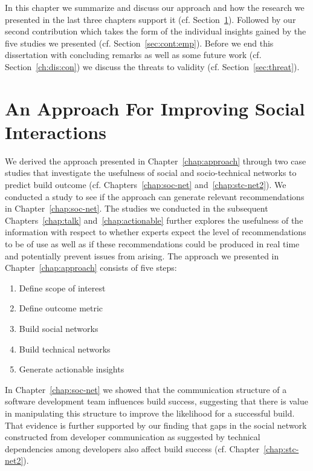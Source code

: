 \label{chap:disc}
In this chapter we summarize and discuss our approach and how the research we presented in the last three chapters support it (cf. Section~\ref{ch:dis:app}).
Followed by our second contribution which takes the form of the individual insights gained by the five studies we presented (cf. Section~\ref{sec:cont:emp}).
Before we end this dissertation with concluding remarks as well as some future work (cf. Section~\ref{ch:dis:con}) we discuss the threats to validity (cf. Section~\ref{sec:threat}).

\section{An Approach For Improving Social Interactions}
\label{ch:dis:app}
We derived the approach presented in Chapter~\ref{chap:approach} through two case studies that investigate the usefulness of social and socio-technical networks to predict build outcome (cf. Chapters~\ref{chap:soc-net} and~\ref{chap:stc-net2}).
We conducted a study to see if the approach can generate relevant recommendations in Chapter~\ref{chap:soc-net}.
The studies we conducted in the subsequent Chapters~\ref{chap:talk} and~\ref{chap:actionable} further explores the usefulness of the information with respect to whether experts expect the level of recommendations to be of use as well as if these recommendations could be produced in real time and potentially prevent issues from arising.
The approach we presented in Chapter~\ref{chap:approach} consists of five steps:

\begin{enumerate}
\item Define scope of interest
\item Define outcome metric
\item Build social networks
\item Build technical networks
\item Generate actionable insights
\end{enumerate}

In Chapter~\ref{chap:soc-net} we showed that the communication structure of a software development team influences build success, suggesting that there is value in manipulating this structure to improve the likelihood for a successful build.
That evidence is further supported by our finding that gaps in the social network constructed from developer communication as suggested by technical dependencies among developers also affect build success (cf. Chapter~\ref{chap:stc-net2}).


